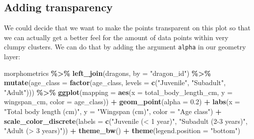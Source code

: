 \documentclass[
]{book}
\newenvironment{Shaded}{\begin{snugshade}}{\end{snugshade}}
\newcommand{\AttributeTok}[1]{\textcolor[rgb]{0.13,0.29,0.53}{#1}}
\newcommand{\FloatTok}[1]{\textcolor[rgb]{0.00,0.00,0.81}{#1}}
\newcommand{\FunctionTok}[1]{\textcolor[rgb]{0.13,0.29,0.53}{\textbf{#1}}}
\newcommand{\NormalTok}[1]{#1}
\newcommand{\SpecialCharTok}[1]{\textcolor[rgb]{0.81,0.36,0.00}{\textbf{#1}}}
\newcommand{\StringTok}[1]{\textcolor[rgb]{0.31,0.60,0.02}{#1}}
\begin{document}
\hypertarget{adding-transparency}{%
\subsection{Adding transparency}\label{adding-transparency}}

We could decide that we want to make the points transparent on this plot so
that we can actually get a better feel for the amount of data points within
very clumpy clusters. We can do that by adding the argument \texttt{alpha} in our
geometry layer:

\begin{Shaded}
\begin{Highlighting}[]
\NormalTok{morphometrics }\SpecialCharTok{\%\textgreater{}\%} 
  \FunctionTok{left\_join}\NormalTok{(dragons, }\AttributeTok{by =} \StringTok{"dragon\_id"}\NormalTok{) }\SpecialCharTok{\%\textgreater{}\%} 
  \FunctionTok{mutate}\NormalTok{(}\AttributeTok{age\_class =} \FunctionTok{factor}\NormalTok{(age\_class, }\AttributeTok{levels =} \FunctionTok{c}\NormalTok{(}\StringTok{"Juvenile"}\NormalTok{,}
                                                  \StringTok{"Subadult"}\NormalTok{,}
                                                  \StringTok{"Adult"}\NormalTok{))) }\SpecialCharTok{\%\textgreater{}\%} 
\FunctionTok{ggplot}\NormalTok{(}\AttributeTok{mapping =} \FunctionTok{aes}\NormalTok{(}\AttributeTok{x =}\NormalTok{ total\_body\_length\_cm, }\AttributeTok{y =}\NormalTok{ wingspan\_cm, }\AttributeTok{color =}\NormalTok{ age\_class)) }\SpecialCharTok{+}
  \FunctionTok{geom\_point}\NormalTok{(}\AttributeTok{alpha =} \FloatTok{0.2}\NormalTok{) }\SpecialCharTok{+}
  \FunctionTok{labs}\NormalTok{(}\AttributeTok{x =} \StringTok{"Total body length (cm)"}\NormalTok{, }\AttributeTok{y =} \StringTok{"Wingspan (cm)"}\NormalTok{, }\AttributeTok{color =} \StringTok{"Age class"}\NormalTok{) }\SpecialCharTok{+}
  \FunctionTok{scale\_color\_discrete}\NormalTok{(}\AttributeTok{labels =} \FunctionTok{c}\NormalTok{(}\StringTok{"Juvenile (\textless{} 1 year)"}\NormalTok{,}
                                 \StringTok{"Subadult (2{-}3 years)"}\NormalTok{,}
                                 \StringTok{"Adult (\textgreater{} 3 years)"}\NormalTok{)) }\SpecialCharTok{+}
  \FunctionTok{theme\_bw}\NormalTok{() }\SpecialCharTok{+}
  \FunctionTok{theme}\NormalTok{(}\AttributeTok{legend.position =} \StringTok{"bottom"}\NormalTok{) }
\end{Highlighting}
\end{Shaded}
\end{document}
